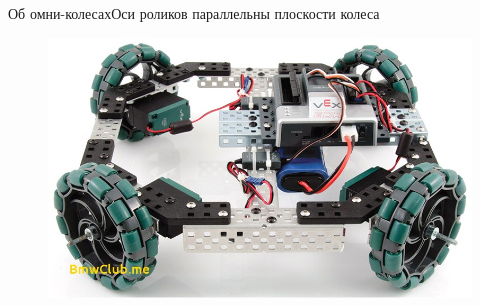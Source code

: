 \documentclass{beamer}
\begin{document}
\begin{frame}{Об омни-колесах}{Оси роликов параллельны плоскости колеса}
\begin{figure}[H]
\begin{columns}
                \centering
                \includegraphics[width=\linewidth]{content/pic/photo/vehicle_four_two_row.jpg}
        \end{columns}
    \end{figure}
\end{frame}
\end{document}
